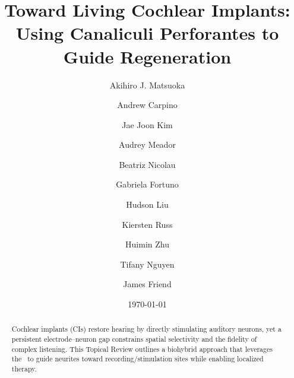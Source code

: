 \documentclass[preprint,aps,pra,floatfix]{revtex4-2}
\begin{document}
\title{Toward Living Cochlear Implants: Using Canaliculi Perforantes to Guide Regeneration}
\author{Akihiro J. Matsuoka}\author{Andrew Carpino}\author{Jae Joon Kim}\author{Audrey Meador}\author{Beatriz Nicolau}\author{Gabriela Fortuno}\author{Hudson Liu}\author{Kiersten Russ}\author{Huimin Zhu}\author{Tifany Nguyen}\author{James Friend}
\date{\today}
\begin{abstract}
Cochlear implants (CIs) restore hearing by directly stimulating auditory neurons, yet a persistent electrode--neuron gap constrains spatial selectivity and the fidelity of complex listening. This Topical Review outlines a biohybrid approach that leverages the \CPS\ to guide neurites toward recording/stimulation sites while enabling localized therapy.
\end{abstract}
\maketitle










\end{document}
